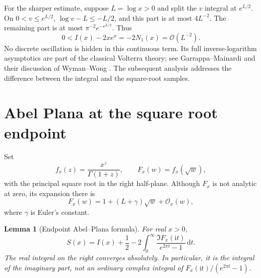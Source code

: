 \documentclass[11pt]{article}
\newtheorem{lemma}[theorem]{Lemma}
\theoremstyle{remark}\newtheorem{remark}[theorem]{Remark}
\newcommand{\OO}{\mathcal O}
\newcommand{\ii}{\mathrm i}
\newcommand{\dd}{\,\mathrm d}
\begin{document}
For the sharper estimate, suppose $L=\log x>0$ and split the $v$ integral at $e^{L/2}$. On $0<v\le e^{L/2}$, $\log v-L\le-L/2$, and this part is at most $4L^{-2}$. The remaining part is at most $\pi^{-2}e^{-e^{L/2}}$. Thus
\begin{equation}\label{srf:eq:contsmall}
 0<I(x)-2xe^x=-2N_1(x)=\OO(L^{-2}).
\end{equation}
No discrete oscillation is hidden in this continuous term. Its full inverse-logarithm asymptotics are part of the classical Volterra theory; see Garrappa--Mainardi and their discussion of Wyman--Wong \cite{gm}. The subsequent analysis addresses the difference between the integral and the square-root samples.

\section{Abel Plana at the square root endpoint}\label{srf:sec:abel}
Set
\[
 f_x(z)=\frac{x^z}{\Gamma(1+z)},\qquad F_x(w)=f_x(\sqrt w),
\]
with the principal square root in the right half-plane. Although $F_x$ is not analytic at zero, its expansion there is
\begin{equation}\label{srf:eq:endpoint}
 F_x(w)=1+(L+\gamma)\sqrt w+\OO_x(w),
\end{equation}
where $\gamma$ is Euler's constant.

\begin{lemma}[Endpoint Abel--Plana formula]\label{srf:lem:abel}
For real $x>0$,
\begin{equation}\label{srf:eq:abel}
 S(x)=I(x)+\frac12
 -2\int_0^\infty
       \frac{\Im F_x(\ii t)}{e^{2\pi t}-1}\dd t.
\end{equation}
The real integral on the right converges absolutely. In particular, it is the integral of the imaginary part, not an ordinary complex integral of $F_x(\ii t)/(e^{2\pi t}-1)$.
\end{lemma}
\end{document}
